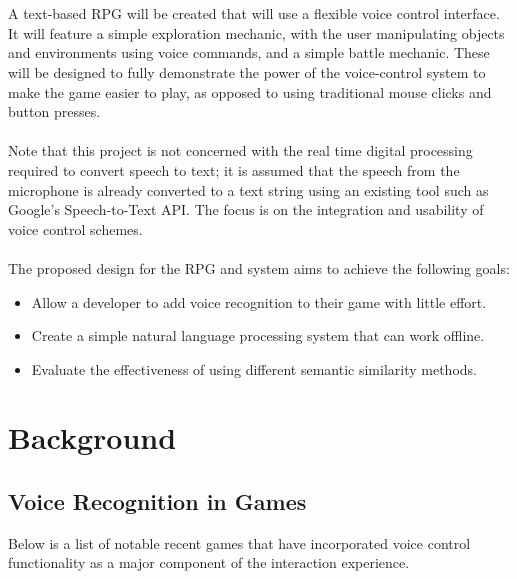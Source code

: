 \documentclass[12pt]{article}
\begin{document}
\\
\\
A text-based RPG will be created that will use a flexible voice control interface. It will feature a simple exploration mechanic, with the user manipulating objects and environments using voice commands, and a simple battle mechanic. These will be designed to fully demonstrate the power of the voice-control system to make the game easier to play, as opposed to using traditional mouse clicks and button presses.
\\
\\
Note that this project is not concerned with the real time digital processing required to convert speech to text; it is assumed that the speech from the microphone is already converted to a text string using an existing tool such as Google's Speech-to-Text API. The focus is on the integration and usability of voice control schemes.
\\
\\
The proposed design for the RPG and system aims to achieve the following goals:
\begin{itemize}
\item Allow a developer to add voice recognition to their game with little effort.
\item Create a simple natural language processing system that can work offline.
\item Evaluate the effectiveness of using different semantic similarity methods.
\end{itemize}

\newpage
\section{Background}

\subsection{Voice Recognition in Games}
Below is a list of notable recent games that have incorporated voice control functionality as a major component of the interaction experience.
\end{document}
